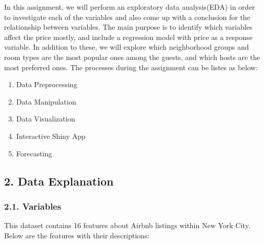 \documentclass[
]{article}
\providecommand{\tightlist}{%
  \setlength{\itemsep}{0pt}\setlength{\parskip}{0pt}}
\begin{document}
In this assignment, we will perform an exploratory data analysis(EDA) in
order to investigate each of the variables and also come up with a
conclusion for the relationship between variables. The main purpose is
to identify which variables affect the price mostly, and include a
regression model with price as a response variable. In addition to
these, we will explore which neighborhood groups and room types are the
most popular ones among the guests, and which hosts are the most
preferred ones. The processes during the assignment can be listes as
below:

\begin{enumerate}
\def\labelenumi{\arabic{enumi}.}
\tightlist
\item
  Data Preprocessing
\item
  Data Manipulation
\item
  Data Visualization
\item
  Interactive Shiny App
\item
  Forecasting
\end{enumerate}

\hypertarget{data-explanation}{%
\subsection{2. Data Explanation}\label{data-explanation}}

\hypertarget{variables}{%
\subsubsection{2.1. Variables}\label{variables}}

This dataset contains 16 features about Airbnb listings within New York
City. Below are the features with their descriptions:
\end{document}
